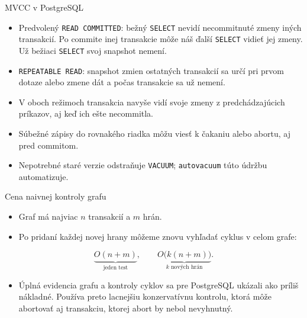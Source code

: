 \documentclass[12pt]{beamer}
\begin{document}
\begin{frame}[fragile]{MVCC v PostgreSQL}
\begin{itemize}
\item Predvolený \verb|READ COMMITTED|: bežný \verb|SELECT| nevidí necommitnuté zmeny iných transakcií.
Po commite inej transakcie môže náš ďalší \verb|SELECT| vidieť jej zmeny.
Už bežiaci \verb|SELECT| svoj snapshot nemení.
\item \verb|REPEATABLE READ|: snapshot zmien ostatných transakcií sa určí pri prvom dotaze
alebo zmene dát a počas transakcie sa už nemení.
\item V oboch režimoch transakcia navyše vidí svoje zmeny z predchádzajúcich príkazov,
aj keď ich ešte necommitla.
\item Súbežné zápisy do rovnakého riadka môžu viesť k čakaniu alebo abortu, aj pred commitom.
\item Nepotrebné staré verzie odstraňuje \verb|VACUUM|;
\verb|autovacuum| túto údržbu automatizuje.
\end{itemize}
\end{frame}

\begin{frame}{Cena naivnej kontroly grafu}
\begin{itemize}
\item Graf má najviac $n$ transakcií a $m$ hrán.
\item Po pridaní každej novej hrany môžeme znovu vyhľadať cyklus v celom grafe:
\end{itemize}
\[
\underbrace{O(n+m)}_{\text{jeden test}},\qquad
\underbrace{O\bigl(k(n+m)\bigr)}_{\text{$k$ nových hrán}}.
\]
\begin{itemize}
\item Úplná evidencia grafu a kontroly cyklov sa pre PostgreSQL ukázali ako príliš nákladné.
Používa preto lacnejšiu konzervatívnu kontrolu, ktorá môže abortovať aj transakciu,
ktorej abort by nebol nevyhnutný.
\end{itemize}
\end{frame}
\end{document}
